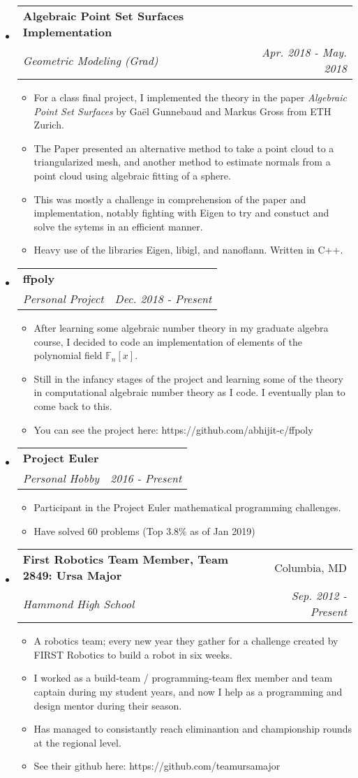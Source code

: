 \documentclass[letterpaper,11pt]{article}
\makeatletter
\newcommand{\resitem}[1]{\item #1 \vspace{-2pt}}
\newcommand{\ressubheading}[4]{
\begin{tabular*}{6.5in}{l@{\cftdotfill{\cftsecdotsep}\extracolsep{\fill}}r}
		\textbf{#1} & #2 \\
		\textit{#3} & \textit{#4} \\
\end{tabular*}\vspace{-6pt}}
\makeatother
\begin{document}
\begin{itemize}
\item
	\ressubheading{Algebraic Point Set Surfaces Implementation}{}{Geometric
    Modeling (Grad)}{Apr. 2018 - May. 2018}
	\begin{itemize}
		\resitem{For a class final project, I implemented the theory in the
        paper \textit{Algebraic Point Set Surfaces} by Ga\={e}l Gunnebaud and
        Markus Gross from ETH Zurich.}
    \resitem{The Paper presented an alternative method to take a point cloud
      to a triangularized mesh, and another method to estimate normals from a
      point cloud using algebraic fitting of a sphere.}
		\resitem{This was mostly a challenge in comprehension of the paper and
      implementation, notably fighting with Eigen to try and constuct and
      solve the sytems in an efficient manner.}
    \resitem{Heavy use of the libraries Eigen, libigl, and nanoflann.
      Written in C++.}
	\end{itemize}

\item
	\ressubheading{ffpoly}{}{Personal Project}{Dec. 2018 - Present}
	\begin{itemize}
		\resitem{After learning some algebraic number theory in my graduate
        algebra course, I decided to code an implementation of elements of the
        polynomial field $\mathbb{F}_n[x]$.}
        \resitem{Still in the infancy stages of the project and learning some of
        the theory in computational algebraic number theory as I code.
        I eventually plan to come back to this.}
        \resitem{You can see the project here:
        https://github.com/abhijit-c/ffpoly}
	\end{itemize}

\item
	\ressubheading{Project Euler}{}{Personal Hobby}{2016 - Present}
	\begin{itemize}
		\resitem{Participant in the Project Euler mathematical programming
        challenges.}
        \resitem{Have solved 60 problems (Top 3.8\% as of Jan 2019)}
	\end{itemize}

\item
	\ressubheading{First Robotics Team Member, Team 2849: Ursa Major}{Columbia, MD}{Hammond High
    School}{Sep. 2012 - Present}
	\begin{itemize}
		\resitem{A robotics team; every new year they gather for a challenge
        created by FIRST Robotics to build a robot in six weeks.}
        \resitem{I worked as a build-team / programming-team flex member and
        team captain during my student years, and now I help as a programming
        and design mentor during their season.}
        \resitem{Has managed to consistantly reach eliminantion and championship
        rounds at the regional level.}
        \resitem{See their github here: https://github.com/teamursamajor}
	\end{itemize}

\end{itemize}
\end{document}

